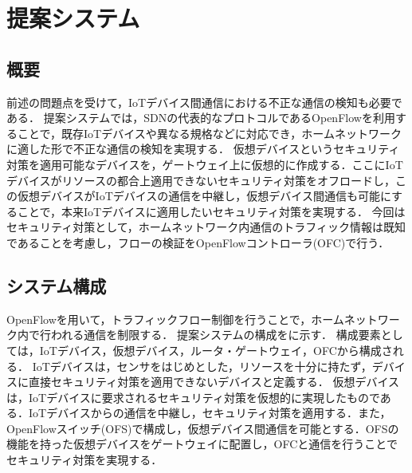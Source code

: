 \documentclass[a4paper,10pt,twocolumn,uplatex]{jsarticle}
\begin{document}

\section{提案システム}
\subsection{概要}
前述の問題点を受けて，IoTデバイス間通信における不正な通信の検知も必要である．
提案システムでは，SDNの代表的なプロトコルであるOpenFlowを利用することで，既存IoTデバイスや異なる規格などに対応でき，ホームネットワークに適した形で不正な通信の検知を実現する．
仮想デバイスというセキュリティ対策を適用可能なデバイスを，ゲートウェイ上に仮想的に作成する．ここにIoTデバイスがリソースの都合上適用できないセキュリティ対策をオフロードし，この仮想デバイスがIoTデバイスの通信を中継し，仮想デバイス間通信も可能にすることで，本来IoTデバイスに適用したいセキュリティ対策を実現する．
今回はセキュリティ対策として，ホームネットワーク内通信のトラフィック情報は既知であることを考慮し，フローの検証をOpenFlowコントローラ(OFC)で行う．


\subsection{システム構成}
OpenFlowを用いて，トラフィックフロー制御を行うことで，ホームネットワーク内で行われる通信を制限する．
提案システムの構成をに示す．
構成要素としては，IoTデバイス，仮想デバイス，ルータ・ゲートウェイ，OFCから構成される．
IoTデバイスは，センサをはじめとした，リソースを十分に持たず，デバイスに直接セキュリティ対策を適用できないデバイスと定義する．
仮想デバイスは，IoTデバイスに要求されるセキュリティ対策を仮想的に実現したものである．IoTデバイスからの通信を中継し，セキュリティ対策を適用する．また，OpenFlowスイッチ(OFS)で構成し，仮想デバイス間通信を可能とする．OFSの機能を持った仮想デバイスをゲートウェイに配置し，OFCと通信を行うことでセキュリティ対策を実現する．
\end{document}
